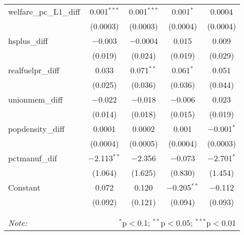 \begin{table}[!htbp]
\begin{tabular}{@{\extracolsep{5pt}}lcccc}
  welfare\_pc\_L1\_diff & 0.001$^{***}$ & 0.001$^{***}$ & 0.001$^{*}$ & 0.0004 \\ 
  & (0.0003) & (0.0003) & (0.0004) & (0.0004) \\ 
  hsplus\_diff & $-$0.003 & $-$0.0004 & 0.015 & 0.009 \\ 
  & (0.019) & (0.024) & (0.019) & (0.029) \\ 
  realfuelpr\_diff & 0.033 & 0.071$^{**}$ & 0.061$^{*}$ & 0.051 \\ 
  & (0.025) & (0.036) & (0.036) & (0.044) \\ 
  unionmem\_diff & $-$0.022 & $-$0.018 & $-$0.006 & 0.023 \\ 
  & (0.014) & (0.018) & (0.015) & (0.019) \\ 
  popdensity\_diff & 0.0001 & 0.0002 & 0.001 & $-$0.001$^{*}$ \\ 
  & (0.0004) & (0.0005) & (0.0004) & (0.0003) \\ 
  pctmanuf\_dif & $-$2.113$^{**}$ & $-$2.356 & $-$0.073 & $-$2.701$^{*}$ \\ 
  & (1.064) & (1.625) & (0.830) & (1.454) \\ 
  Constant & 0.072 & 0.120 & $-$0.205$^{**}$ & $-$0.112 \\ 
  & (0.092) & (0.121) & (0.094) & (0.093) \\ 
 \hline \\[-1.8ex] 
\hline 
\hline \\[-1.8ex] 
\textit{Note:}  & \multicolumn{4}{r}{$^{*}$p$<$0.1; $^{**}$p$<$0.05; $^{***}$p$<$0.01} \\ 
\end{tabular} 
\end{table} 

